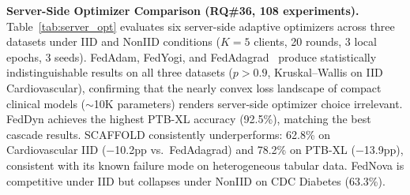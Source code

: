 \documentclass[conference,a4paper]{IEEEtran}
\begin{document}
\smallskip\noindent\textbf{Server-Side Optimizer Comparison (RQ\#36, 108 experiments).}
Table~\ref{tab:server_opt} evaluates six server-side adaptive optimizers across three datasets under IID and NonIID conditions ($K{=}5$ clients, 20 rounds, 3 local epochs, 3 seeds). FedAdam, FedYogi, and FedAdagrad~\cite{reddi2021adaptive} produce statistically indistinguishable results on all three datasets ($p{>}0.9$, Kruskal--Wallis on IID Cardiovascular), confirming that the nearly convex loss landscape of compact clinical models ($\sim$10K parameters) renders server-side optimizer choice irrelevant. FedDyn achieves the highest PTB-XL accuracy (92.5\%), matching the best cascade results. SCAFFOLD consistently underperforms: 62.8\% on Cardiovascular IID ($-$10.2pp vs.\ FedAdagrad) and 78.2\% on PTB-XL ($-$13.9pp), consistent with its known failure mode on heterogeneous tabular data. FedNova is competitive under IID but collapses under NonIID on CDC Diabetes (63.3\%).
\end{document}
